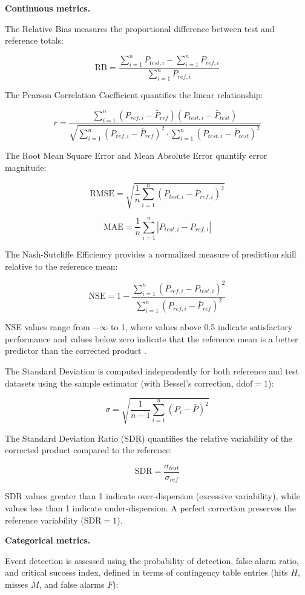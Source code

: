 \documentclass[remotesensing,article,submit,pdftex,moreauthors]{Definitions/mdpi}
\begin{document}
\textbf{Continuous metrics.}

The Relative Bias measures the proportional difference between test and
reference totals:

\[\text{RB} = \frac{\sum_{i=1}^{n} P_{test,i} - \sum_{i=1}^{n} P_{ref,i}}{\sum_{i=1}^{n} P_{ref,i}}\]

The Pearson Correlation Coefficient quantifies the linear relationship:

\[r = \frac{\sum_{i=1}^{n}(P_{ref,i} - \bar{P}_{ref})(P_{test,i} - \bar{P}_{test})}{\sqrt{\sum_{i=1}^{n}(P_{ref,i} - \bar{P}_{ref})^2 \cdot \sum_{i=1}^{n}(P_{test,i} - \bar{P}_{test})^2}}\]

The Root Mean Square Error and Mean Absolute Error quantify error
magnitude:

\[\text{RMSE} = \sqrt{\frac{1}{n} \sum_{i=1}^{n} (P_{test,i} - P_{ref,i})^2}\]

\[\text{MAE} = \frac{1}{n} \sum_{i=1}^{n} |P_{test,i} - P_{ref,i}|\]

The Nash-Sutcliffe Efficiency provides a normalized measure of
prediction skill relative to the reference mean:

\[\text{NSE} = 1 - \frac{\sum_{i=1}^{n}(P_{ref,i} - P_{test,i})^2}{\sum_{i=1}^{n}(P_{ref,i} - \bar{P}_{ref})^2}\]

NSE values range from \(-\infty\) to 1, where values above 0.5 indicate
satisfactory performance and values below zero indicate that the
reference mean is a better predictor than the corrected product
\cite{ref28,ref29}.

The Standard Deviation is computed independently for both reference and
test datasets using the sample estimator (with Bessel's correction,
\(\text{ddof} = 1\)):

\[\sigma = \sqrt{\frac{1}{n-1} \sum_{i=1}^{n} (P_i - \bar{P})^2}\]

The Standard Deviation Ratio (SDR) quantifies the relative variability
of the corrected product compared to the reference:

\[\text{SDR} = \frac{\sigma_{test}}{\sigma_{ref}}\]

SDR values greater than 1 indicate over-dispersion (excessive
variability), while values less than 1 indicate under-dispersion. A
perfect correction preserves the reference variability
(\(\text{SDR} = 1\)).

\textbf{Categorical metrics.}

Event detection is assessed using the probability of detection, false
alarm ratio, and critical success index, defined in terms of contingency
table entries (hits \(H\), misses \(M\), and false alarms \(F\)):
\end{document}
